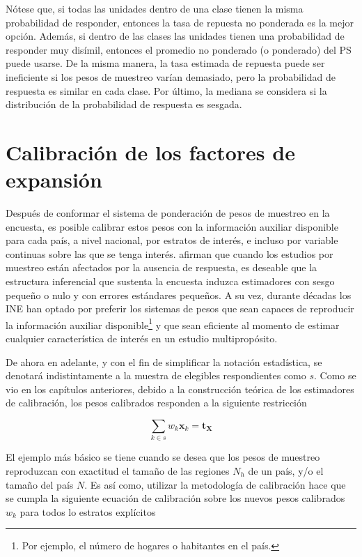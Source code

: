 \documentclass[
  12pt,
]{book}
\begin{document}
Nótese que, si todas las unidades dentro de una clase tienen la misma probabilidad de responder, entonces la tasa de repuesta no ponderada es la mejor opción. Además, si dentro de las clases las unidades tienen una probabilidad de responder muy disímil, entonces el promedio no ponderado (o ponderado) del PS puede usarse. De la misma manera, la tasa estimada de repuesta puede ser ineficiente si los pesos de muestreo varían demasiado, pero la probabilidad de respuesta es similar en cada clase. Por último, la mediana se considera si la distribución de la probabilidad de respuesta es sesgada.

\hypertarget{calibraciuxf3n-de-los-factores-de-expansiuxf3n}{%
\section{Calibración de los factores de expansión}\label{calibraciuxf3n-de-los-factores-de-expansiuxf3n}}

Después de conformar el sistema de ponderación de pesos de muestreo en la encuesta, es posible calibrar estos pesos con la información auxiliar disponible para cada país, a nivel nacional, por estratos de interés, e incluso por variable continuas sobre las que se tenga interés. \citet{Sarndal_Lundstrom_2006} afirman que cuando los estudios por muestreo están afectados por la ausencia de respuesta, es deseable que la estructura inferencial que sustenta la encuesta induzca estimadores con sesgo pequeño o nulo y con errores estándares pequeños. A su vez, durante décadas los INE han optado por preferir los sistemas de pesos que sean capaces de reproducir la información auxiliar disponible\footnote{Por ejemplo, el número de hogares o habitantes en el país.} y que sean eficiente al momento de estimar cualquier característica de interés en un estudio multipropósito.

De ahora en adelante, y con el fin de simplificar la notación estadística, se denotará indistintamente a la muestra de elegibles respondientes como \(s\). Como se vio en los capítulos anteriores, debido a la construcción teórica de los estimadores de calibración, los pesos calibrados responden a la siguiente restricción

\[
\sum_{k\in s}w_k\mathbf{x}_k = \mathbf{t_X}
\]

El ejemplo más básico se tiene cuando se desea que los pesos de muestreo reproduzcan con exactitud el tamaño de las regiones \(N_h\) de un país, y/o el tamaño del país \(N\). Es así como, utilizar la metodología de calibración \citep{Deville_Sarndal_1992} hace que se cumpla la siguiente ecuación de calibración sobre los nuevos pesos calibrados \(w_k\) para todos lo estratos explícitos
\end{document}
